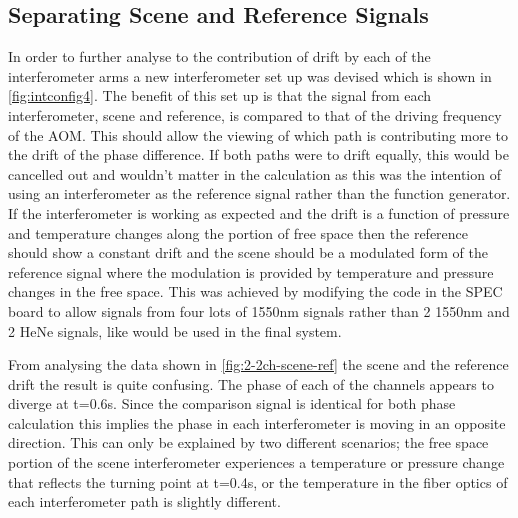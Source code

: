 \documentclass[12pt,a4paper,oneside]{report}
\begin{document}
\subsection{Separating Scene and Reference Signals}

In order to further analyse to the contribution of drift by each of the interferometer arms a new interferometer set up was devised which is shown in \autoref{fig:intconfig4}. The benefit of this set up is that the signal from each interferometer, scene and reference, is compared to that of the driving frequency of the AOM. This should allow the viewing of which path is contributing more to the drift of the phase difference. If both paths were to drift equally, this would be cancelled out and wouldn't matter in the calculation as this was the intention of using an interferometer as the reference signal rather than the function generator. If the interferometer is working as expected and the drift is a function of pressure and temperature changes along the portion of free space then the reference should show a constant drift and the scene should be a modulated form of the reference signal where the modulation is provided by temperature and pressure changes in the free space. This was achieved by modifying the code in the SPEC board to allow signals from four lots of 1550nm signals rather than 2 1550nm and 2 HeNe signals, like would be used in the final system.

From analysing the data shown in \autoref{fig:2-2ch-scene-ref} the scene and the reference drift the result is quite confusing. The phase of each of the channels appears to diverge at t=0.6s. Since the comparison signal is identical for both phase calculation this implies the phase in each interferometer is moving in an opposite direction. This can only be explained by two different scenarios; the free space portion of the scene interferometer experiences a temperature or pressure change that reflects the turning point at t=0.4s, or the temperature in the fiber optics of each interferometer path is slightly different.
\end{document}

